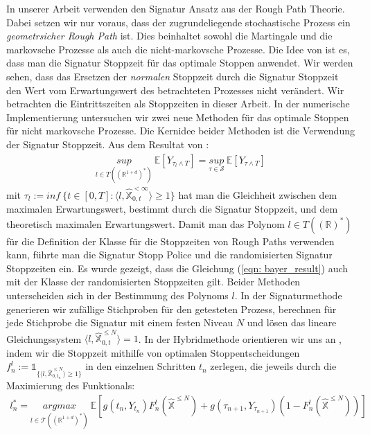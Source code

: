 \documentclass[12pt,titlepage,headsepline]{article}
\begin{document}
    \hfill\break
    In unserer Arbeit verwenden den Signatur Ansatz aus der Rough Path Theorie. Dabei setzen wir nur voraus, dass der zugrundeliegende stochastische Prozess ein \textit{geometrsicher Rough Path} ist. Dies beinhaltet sowohl die Martingale und die markovsche Prozesse als auch die nicht-markovsche Prozesse. Die Idee von \cite{bayer_optimal_2020} ist es, dass man die Signatur Stoppzeit für das optimale Stoppen anwendet. Wir werden sehen, dass das Ersetzen der \textit{normalen} Stoppzeit durch die Signatur Stoppzeit den Wert vom Erwartungswert des betrachteten Prozesses nicht verändert. Wir betrachten die Eintrittszeiten als Stoppzeiten in dieser Arbeit.
    \hfill\break
    In der numerische Implementierung untersuchen wir zwei neue Methoden für das optimale Stoppen für nicht markovsche Prozesse. Die Kernidee beider Methoden ist die Verwendung der Signatur Stoppzeit. Aus dem Resultat von \cite{bayer_optimal_2020}:
    \begin{align}\label{eqn: bayer_result}
      \underset{l \in T((\mathbb{R}^{1+d})^*)}{sup} \ \mathbb{E}[Y_{\tau_l \land T}] = \underset{\tau \in \mathcal{S}}{sup} \ \mathbb{E}[Y_{\tau \land T}]
    \end{align}
    mit $\tau_l := inf \ \bigg\{ t \in [0,T] : \langle l,\hat{\mathbb{X}}^{<\infty}_{0,t}\rangle \geq 1 \bigg\}$ hat man die Gleichheit zwischen dem maximalen Erwartungswert, bestimmt durch die Signatur Stoppzeit, und dem theoretisch maximalen Erwartungswert.
    \hfill\break
    Damit man das Polynom $l \in T((\mathbb{R})^*)$ für die Definition der Klasse für die Stoppzeiten von Rough Paths verwenden kann, führte man die Signatur Stopp Police und die randomisierten Signatur Stoppzeiten ein. Es wurde gezeigt, dass die Gleichung (\ref{eqn: bayer_result}) auch mit der Klasse der randomisierten Stoppzeiten gilt.
    \hfill\break
    Beider Methoden unterscheiden sich in der Bestimmung des Polynoms $l$. In der Signaturmethode generieren wir zufällige Stichproben für den getesteten Prozess, berechnen für jede Stichprobe die Signatur mit einem festen Niveau $N$ und lösen das lineare Gleichungssystem $\langle l,\hat{\mathbb{X}}^{\leq N}_{0,t}\rangle = 1$. In der Hybridmethode orientieren wir uns an \cite{becker_deep_2019}, indem wir die Stoppzeit mithilfe von optimalen Stoppentscheidungen $f_n^l := \mathds{1}_{ \{ \langle l, \hat{\mathbb{X}}^{\leq N}_{0,t_n}  \rangle \geq 1 \} }$ in den einzelnen Schritten $t_n$ zerlegen, die jeweils durch die Maximierung des Funktionals:
    \begin{align*}
      l_n^* = \underset{l \in \mathcal{T}((\mathbb{R}^{1+d})^*)}{argmax} \ \mathbb{E}[g(t_n, Y_{t_n})F_n^l(\hat{\mathbb{X}}^{\leq N})+g(\tau_{n+1},Y_{\tau_{n+1}})(1-F_n^l(\hat{\mathbb{X}}^{\leq N})) ]
    \end{align*}
\end{document}
